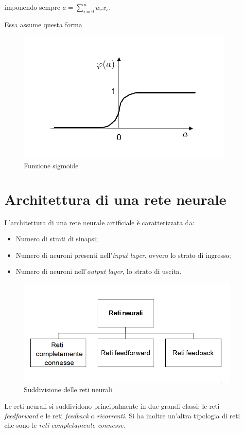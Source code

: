 \documentclass[12pt,a4paper,oneside]{book}
\begin{document}
		imponendo sempre $a=\sum\limits_{i=0}^n w_{i}x_{i}$.
	
		Essa assume questa forma
		\begin{figure}[h]
			\centering
			\includegraphics[width=0.6\linewidth]{IMMAGINI/sigmoide}
			\caption{ Funzione sigmoide }
			\label{fig:sigmoide}
		\end{figure}
	
		
		\section{Architettura di una rete neurale }
		
		L'architettura di una rete neurale artificiale è caratterizzata da:
		
		\begin{itemize}
			\item Numero di strati di sinapsi;
			\item Numero di neuroni presenti nell'\emph{input layer}, ovvero lo strato di ingresso;
			\item Numero di neuroni nell'\emph{output layer}, lo strato di uscita.
		\end{itemize}
	
		\begin{figure}[h]
			\centering
			\includegraphics[width=0.7\linewidth]{IMMAGINI/diagrammareti}
			\caption{ Suddivisione delle reti neurali}
			\label{fig:diagrammareti}
		\end{figure}
		
		
		Le reti neurali si suddividono principalmente in due grandi classi: le reti \emph{feedforward} e le reti \emph{feedback} o \emph{ricorrenti}. 
		Si ha inoltre un'altra tipologia di reti che sono le \emph{reti completamente connesse}.\\
		
\end{document}
